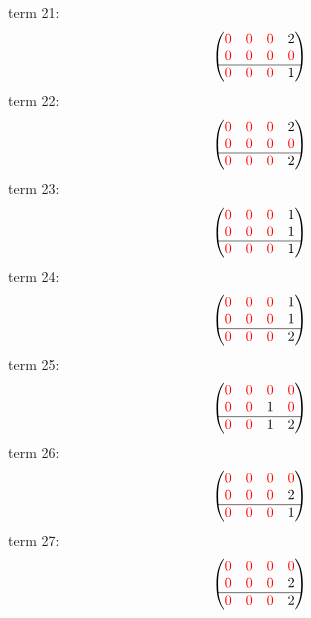 \documentclass{article}
\begin{document}
term 21:
$$\begin{pmatrix}{\color{red} 0} & {\color{red} 0} & {\color{red} 0} & 2\\
{\color{red} 0} & {\color{red} 0} & {\color{red} 0} & {\color{red} 0}\\
\hline{\color{red} 0} & {\color{red} 0} & {\color{red} 0} & 1\\
\end{pmatrix}$$
term 22:
$$\begin{pmatrix}{\color{red} 0} & {\color{red} 0} & {\color{red} 0} & 2\\
{\color{red} 0} & {\color{red} 0} & {\color{red} 0} & {\color{red} 0}\\
\hline{\color{red} 0} & {\color{red} 0} & {\color{red} 0} & 2\\
\end{pmatrix}$$
term 23:
$$\begin{pmatrix}{\color{red} 0} & {\color{red} 0} & {\color{red} 0} & 1\\
{\color{red} 0} & {\color{red} 0} & {\color{red} 0} & 1\\
\hline{\color{red} 0} & {\color{red} 0} & {\color{red} 0} & 1\\
\end{pmatrix}$$
term 24:
$$\begin{pmatrix}{\color{red} 0} & {\color{red} 0} & {\color{red} 0} & 1\\
{\color{red} 0} & {\color{red} 0} & {\color{red} 0} & 1\\
\hline{\color{red} 0} & {\color{red} 0} & {\color{red} 0} & 2\\
\end{pmatrix}$$
term 25:
$$\begin{pmatrix}{\color{red} 0} & {\color{red} 0} & {\color{red} 0} & {\color{red} 0}\\
{\color{red} 0} & {\color{red} 0} & 1 & {\color{red} 0}\\
\hline{\color{red} 0} & {\color{red} 0} & 1 & 2\\
\end{pmatrix}$$
term 26:
$$\begin{pmatrix}{\color{red} 0} & {\color{red} 0} & {\color{red} 0} & {\color{red} 0}\\
{\color{red} 0} & {\color{red} 0} & {\color{red} 0} & 2\\
\hline{\color{red} 0} & {\color{red} 0} & {\color{red} 0} & 1\\
\end{pmatrix}$$
term 27:
$$\begin{pmatrix}{\color{red} 0} & {\color{red} 0} & {\color{red} 0} & {\color{red} 0}\\
{\color{red} 0} & {\color{red} 0} & {\color{red} 0} & 2\\
\hline{\color{red} 0} & {\color{red} 0} & {\color{red} 0} & 2\\
\end{pmatrix}$$
\end{document}
